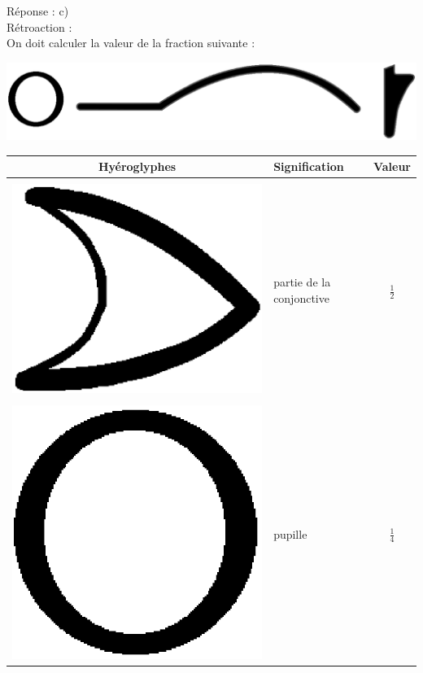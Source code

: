 \documentclass[letterpaper, 12pt]{article}
\begin{document}
R\'eponse : c)\\

R\'etroaction :\\
On doit calculer la valeur de la fraction suivante :\\
\begin{center}
\includegraphics[scale=0.1]{fraction.eps}\\
\begin{tabular}{|c|l|c|}\hline
{\bf Hy\'eroglyphes} & {\bf Signification} & {\bf Valeur}\\ \hline
& & \\
\includegraphics[scale=0.1]{conjonctivedemi.eps} & partie de la conjonctive & {\Large$\frac{1}{2}$}\\[2mm] \hline
& & \\
\includegraphics[scale=0.1]{pupille.eps} & pupille & {\Large$\frac{1}{4}$}\\[2mm] \hline

\end{tabular}
\end{center}
\end{document}
